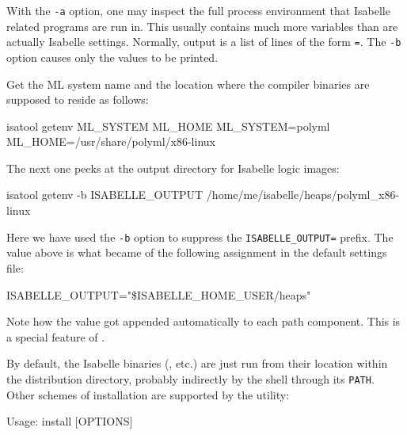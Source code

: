 \begin{isabellebody}
\begin{isamarkuptext}
  With the \verb|-a| option, one may inspect the full process
  environment that Isabelle related programs are run in. This usually
  contains much more variables than are actually Isabelle settings.
  Normally, output is a list of lines of the form \verb|=|. The \verb|-b| option
  causes only the values to be printed.%
\end{isamarkuptext}%
\isamarkuptrue%
%
\isamarkuptrue%
%
\begin{isamarkuptext}%
Get the ML system name and the location where the compiler binaries
  are supposed to reside as follows:
\begin{ttbox}
isatool getenv ML_SYSTEM ML_HOME
{\out ML_SYSTEM=polyml}
{\out ML_HOME=/usr/share/polyml/x86-linux}
\end{ttbox}

  The next one peeks at the output directory for Isabelle logic
  images:
\begin{ttbox}
isatool getenv -b ISABELLE_OUTPUT
{\out /home/me/isabelle/heaps/polyml_x86-linux}
\end{ttbox}
  Here we have used the \verb|-b| option to suppress the
  \verb|ISABELLE_OUTPUT=| prefix.  The value above is what
  became of the following assignment in the default settings file:
\begin{ttbox}
ISABELLE_OUTPUT="\$ISABELLE_HOME_USER/heaps"
\end{ttbox}

  Note how the \hyperlink{setting.ML-IDENTIFIER}{\mbox{}} value got appended
  automatically to each path component. This is a special feature of
  \hyperlink{setting.ISABELLE-OUTPUT}{\mbox{}}.%
\end{isamarkuptext}%
\isamarkuptrue%
%
\isamarkuptrue%
%
\begin{isamarkuptext}%
By default, the Isabelle binaries (\hyperlink{executable.isabelle}{\mbox{}},
  \hyperlink{executable.isatool}{\mbox{}} etc.) are just run from their location within
  the distribution directory, probably indirectly by the shell through
  its \verb|PATH|.  Other schemes of installation are supported
  by the \hypertarget{tool.install}{\hyperlink{tool.install}{\mbox{}}} utility:
\begin{ttbox}
Usage: install [OPTIONS]


\end{ttbox}
\end{isamarkuptext}
\end{isabellebody}

